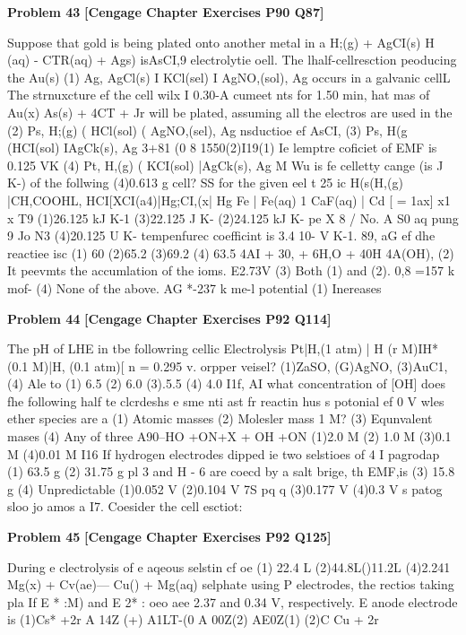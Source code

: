 \begin{problembox}
\textbf{Problem 43} \hfill \textbf{[Cengage Chapter Exercises P90 Q87]}
\label{q:ext-cng-th-43}

Suppose that gold is being plated onto another metal in a
H;(g) + AgCI(s) H (aq) - CTR(aq) + Ags)
isAsCI,9
electrolytie oell. The lhalf-cellresction peoducing the Au(s)
(1) Ag, AgCl(s) I KCl(sel) I AgNO,(sol), Ag
occurs in a galvanic cellL The strnuxcture ef the cell wilx
I  0.30-A cumeet nts for 1.50 min, hat mas of Au(x)
  As(s) + 4CT + Jr
will be plated, assuming all the electros are used in the
(2) Ps, H;(g) ( HCl(sol) ( AgNO,(sel), Ag
nsductioe ef AsCI,
(3) Ps, H(g (HCI(sol) IAgCk(s), Ag
3+81 (0 8 1550(2)I19(1)
 Ie lemptre coficiet of EMF is 0.125 VK
(4) Pt, H,(g) ( KCI(sol) |AgCk(s), Ag
M Wu is fe celletty cange (is J K-) of the follwing
(4)0.613 g
cell?
SS for the given eel t 25  ic
H(s(H,(g) |CH,COOHL, HCI[XCI(a4)|Hg;CI,(x| Hg
Fe | Fe(aq) 1 CaF(aq) | Cd
[ = 1ax]
x1 x T9
(1)26.125 kJ K-1
(3)22.125 J K-
(2)24.125 kJ K-
pe X 8 / No.  A S0 aq  pung  9  Jo N3 
(4)20.125 U K-
tempenfurec coefficint is 3.4   10- V K-1.
89, aG  ef dhe reactiee isc
(1) 60
(2)65.2
(3)69.2
(4) 63.5
4AI + 30, + 6H,O + 40H 
 4A(OH),
(2) It peevmts the accumlation of the ioms.
E2.73V
(3) Both (1) and (2).
0,8 =157 k mof-
(4) None of the above.
AG  *-237 k me-l
potential
(1) Inereases
\end{problembox}

\begin{problembox}
\textbf{Problem 44} \hfill \textbf{[Cengage Chapter Exercises P92 Q114]}
\label{q:ext-cng-th-44}

The pH of LHE in tbe followring cellic
Electrolysis
Pt|H,(1 atm) | H  (r M)IH*(0.1 M)|H, (0.1 atm)[
n = 0.295 v.
orpper veisel?
(1)ZaSO, (G)AgNO, (3)AuC1,
(4) Ale to
(1) 6.5
(2) 6.0
(3).5.5
(4) 4.0
I1f, AI what concentration of [OH] does fhe following half
te clcrdeshs e sme nti ast fr
reactin hus s potonial ef 0 V wles ether species are a
(1) Atomic masses
(2) Molesler mass
1 M?
(3) Equnvalent mases
(4) Any of three
A90--HO +ON+X + OH +ON
(1)2.0 M
(2) 1.0 M
(3)0.1 M
(4)0.01 M
I16 If hydrogen electrodes dipped ie two selstioes of
4 I pagrodap
(1) 63.5 g
(2) 31.75 g
pl  3 and H - 6 are coecd by a salt brige, th
EMF,is
(3) 15.8 g
(4) Unpredictable
(1)0.052 V
(2)0.104 V
7S pq q
(3)0.177 V
(4)0.3 V
s patog sloo jo amos a
I7. Coesider the cell esctiot:
\end{problembox}

\begin{problembox}
\textbf{Problem 45} \hfill \textbf{[Cengage Chapter Exercises P92 Q125]}
\label{q:ext-cng-th-45}

During e clectrolysis of e aqeous selstin cf oe
(1) 22.4 L
(2)44.8L()11.2L
(4)2.241
Mg(x) + Cv(ae)---  Cu() + Mg(aq)
selphate using P electrodes, the rectios taking pla
If E * :M) and E 2* : oeo aee 2.37 and 0.34 V,
respectively. E
anode electrode is
(1)Cs* +2r  
A 14Z (+) A1LT-(0 A 00Z(2) AE0Z(1)
(2)C  Cu  + 2r
\end{problembox}

